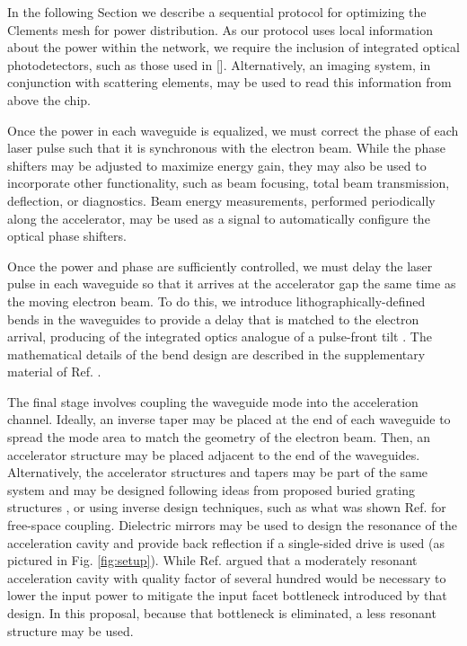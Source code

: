 \documentclass[%
 reprint,
 amsmath,amssymb,
 aps,
prstab,
floatfix,
]{revtex4-1}
\begin{document}
In the following Section we describe a sequential protocol for optimizing the Clements mesh for power distribution. As our protocol uses local information about the power within the network, we require the inclusion of integrated optical photodetectors, such as those used in [].  Alternatively, an imaging system, in conjunction with scattering elements, may be used to read this information from above the chip.

Once the power in each waveguide is equalized, we must correct the phase of each laser pulse such that it is synchronous with the electron beam. While the phase shifters may be adjusted to maximize energy gain, they may also be used to incorporate other functionality, such as beam focusing, total beam transmission, deflection, or diagnostics.  Beam energy measurements, performed periodically along the accelerator, may be used as a signal to automatically configure the optical phase shifters.

Once the power and phase are sufficiently controlled, we must delay the laser pulse in each waveguide so that it arrives at the accelerator gap the same time as the moving electron beam. To do this, we introduce lithographically-defined bends in the waveguides to provide a delay that is matched to the electron arrival, producing of the integrated optics analogue of a pulse-front tilt \cite{cesar_optical_2018}. The mathematical details of the bend design are described in the supplementary material of Ref. \cite{hughes_-chip_2017}.

The final stage involves coupling the waveguide mode into the acceleration channel.  Ideally, an inverse taper may be placed at the end of each waveguide to spread the mode area to match the geometry of the electron beam.  Then, an accelerator structure may be placed adjacent to the end of the waveguides.  Alternatively, the accelerator structures and tapers may be part of the same system and may be designed following ideas from proposed buried grating structures \cite{chang_silicon_2014}, or using inverse design techniques, such as what was shown Ref. \cite{hughes_method_2017} for free-space coupling.  Dielectric mirrors may be used to design the resonance of the acceleration cavity and provide back reflection if a single-sided drive is used (as pictured in Fig. \ref{fig:setup}).  While Ref. \cite{hughes_-chip_2017} argued that a moderately resonant acceleration cavity with quality factor of several hundred would be necessary to lower the input power to mitigate the input facet bottleneck introduced by that design.  In this proposal, because that bottleneck is eliminated, a less resonant structure may be used.
\end{document}
